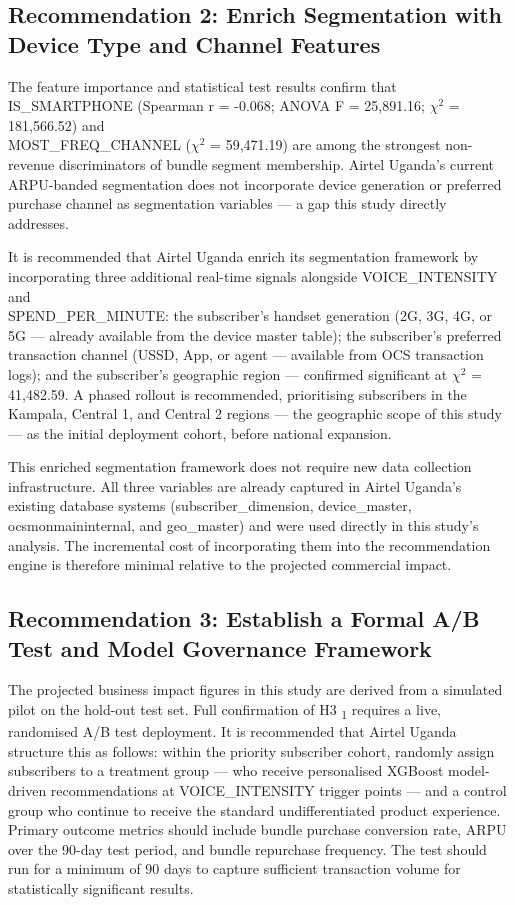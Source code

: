 \subsection{Recommendation 2: Enrich Segmentation with Device Type and Channel Features}

The feature importance and statistical test results confirm that IS\_SMARTPHONE (Spearman r = -0.068; ANOVA F = 25,891.16; $\chi^2$ = 181,566.52) and \\MOST\_FREQ\_CHANNEL ($\chi^2$ = 59,471.19) are among the strongest non-revenue discriminators of bundle segment membership. Airtel Uganda's current ARPU-banded segmentation does not incorporate device generation or preferred purchase channel as segmentation variables --- a gap this study directly addresses.

It is recommended that Airtel Uganda enrich its segmentation framework by incorporating three additional real-time signals alongside VOICE\_INTENSITY and \\SPEND\_PER\_MINUTE: the subscriber's handset generation (2G, 3G, 4G, or 5G --- already available from the device master table); the subscriber's preferred transaction channel (USSD, App, or agent --- available from OCS transaction logs); and the subscriber's geographic region --- confirmed significant at $\chi^2$ = 41,482.59. A phased rollout is recommended, prioritising subscribers in the Kampala, Central 1, and Central 2 regions --- the geographic scope of this study --- as the initial deployment cohort, before national expansion.

This enriched segmentation framework does not require new data collection infrastructure. All three variables are already captured in Airtel Uganda's existing database systems (subscriber\_dimension, device\_master, ocsmonmaininternal, and geo\_master) and were used directly in this study's analysis. The incremental cost of incorporating them into the recommendation engine is therefore minimal relative to the projected commercial impact.

\subsection{Recommendation 3: Establish a Formal A/B Test and Model Governance Framework}
\label{sec:abt}

The projected business impact figures in this study are derived from a simulated pilot on the hold-out test set. Full confirmation of H3	\textsubscript{1} requires a live, randomised A/B test deployment. It is recommended that Airtel Uganda structure this as follows: within the priority subscriber cohort, randomly assign subscribers to a treatment group --- who receive personalised XGBoost model-driven recommendations at VOICE\_INTENSITY trigger points --- and a control group who continue to receive the standard undifferentiated product experience. Primary outcome metrics should include bundle purchase conversion rate, ARPU over the 90-day test period, and bundle repurchase frequency. The test should run for a minimum of 90 days to capture sufficient transaction volume for statistically significant results.

